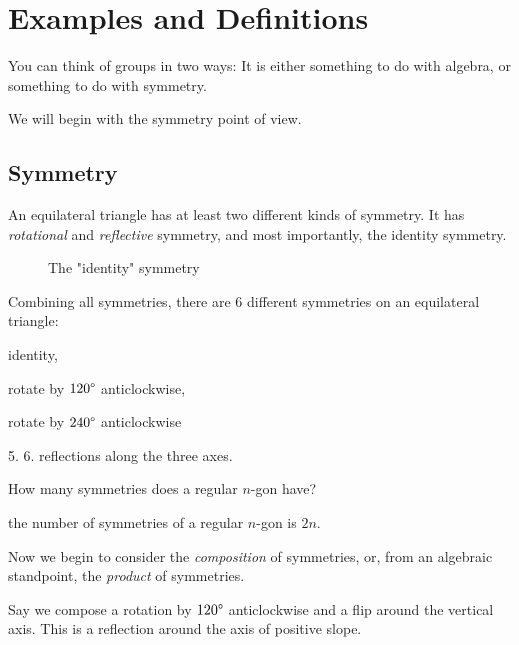 \documentclass[12pt]{article}
\begin{document}

\section{Examples and Definitions}

You can think of groups in two ways:
It is either something to do with algebra,
or something to do with symmetry.

We will begin with the symmetry point of view.

\subsection{Symmetry}

An equilateral triangle has at least two different kinds of symmetry.
It has \emph{rotational} and \emph{reflective} symmetry,
and most importantly, the identity symmetry.

\begin{figure}[h]
    \centering
    \caption{The "identity" symmetry}
\end{figure}

Combining all symmetries, there are 6 different symmetries 
on an equilateral triangle:
\begin{compactenum}
    \item identity,
    \item rotate by $120\degree$ anticlockwise,
    \item rotate by $240\degree$ anticlockwise
    \item 5. 6. reflections along the three axes.
\end{compactenum}

\begin{exercise}
    How many symmetries does a regular $n$-gon have?
\end{exercise}
\begin{answer}
    the number of symmetries of a regular $n$-gon is $2n$.
\end{answer}

Now we begin to consider the \emph{composition} of symmetries,
or, from an algebraic standpoint, the \emph{product} of symmetries.

Say we compose a rotation by $120\degree$ anticlockwise and
a flip around the vertical axis. This is a reflection around 
the axis of positive slope.
\end{document}

